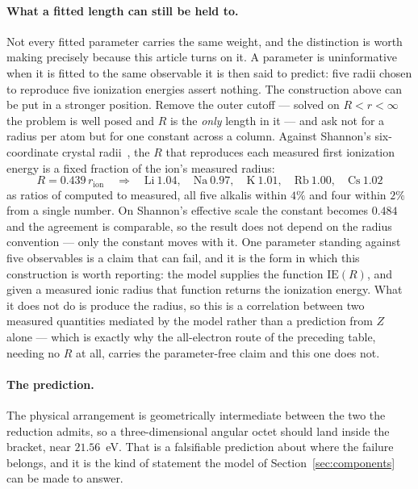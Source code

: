 \documentclass[11pt]{article}
\begin{document}
\paragraph{What a fitted length can still be held to.} Not every fitted parameter carries the same
weight, and the distinction is worth making precisely because this article turns on it. A parameter
is uninformative when it is fitted to the same observable it is then said to predict: five radii
chosen to reproduce five ionization energies assert nothing. The construction above can be put in a
stronger position. Remove the outer cutoff --- solved on $R<r<\infty$ the problem is well posed and
$R$ is the \emph{only} length in it --- and ask not for a radius per atom but for one constant
across a column. Against Shannon's six-coordinate crystal radii~\cite{Shannon1976}, the $R$ that
reproduces each measured first ionization energy is a fixed fraction of the ion's measured radius:
\[
R = 0.439\,r_{\mathrm{ion}} \quad\Longrightarrow\quad
\mathrm{Li}\ 1.04,\quad \mathrm{Na}\ 0.97,\quad \mathrm{K}\ 1.01,\quad
\mathrm{Rb}\ 1.00,\quad \mathrm{Cs}\ 1.02
\]
as ratios of computed to measured, all five alkalis within $4\%$ and four within $2\%$ from a single
number. On Shannon's effective scale the constant becomes $0.484$ and the agreement is comparable,
so the result does not depend on the radius convention --- only the constant moves with it. One
parameter standing against five observables is a claim that can fail, and it is the form in which
this construction is worth reporting: the model supplies the function $\mathrm{IE}(R)$, and given a
measured ionic radius that function returns the ionization energy. What it does not do is produce
the radius, so this is a correlation between two measured quantities mediated by the model rather
than a prediction from $Z$ alone --- which is exactly why the all-electron route of the preceding
table, needing no $R$ at all, carries the parameter-free claim and this one does not.

\paragraph{The prediction.} The physical arrangement is geometrically intermediate between the two
the reduction admits, so a three-dimensional angular octet should land inside the bracket, near
$21.56$~eV. That is a falsifiable prediction about where the failure belongs, and it is the kind of
statement the model of Section~\ref{sec:components} can be made to answer.
\end{document}
